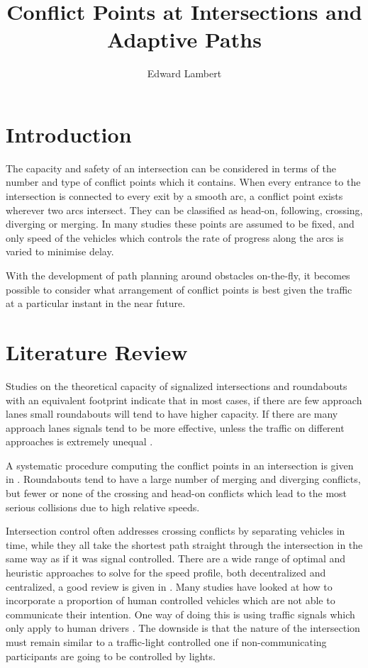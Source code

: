 \documentclass[11pt]{article} %
\title{Conflict Points at Intersections and Adaptive Paths}
\author{Edward Lambert}
\begin{document}
\maketitle

\section{Introduction}
The capacity and safety of an intersection can be considered in terms of the number and type of conflict points which it contains. When every entrance to the intersection is connected to every exit by a smooth arc, a conflict point exists wherever two arcs intersect. They can be classified as head-on, following, crossing, diverging or merging. In many studies these points are assumed to be fixed, and only speed of the vehicles which controls the rate of progress along the arcs is varied to minimise delay. 

With the development of path planning around obstacles on-the-fly, it becomes possible to consider what arrangement of conflict points is best given the traffic at a particular instant in the near future. 

\section{Literature Review} 
Studies on the theoretical capacity of signalized intersections and roundabouts with an equivalent footprint indicate that in most cases, if there are few approach lanes small roundabouts will tend to have higher capacity. If there are many approach lanes signals tend to be more effective, unless the traffic on different approaches is extremely unequal \cite{Jian-an2001}. 

A systematic procedure computing the conflict points in an intersection is given in \cite{Lu2013}. Roundabouts tend to have a large number of merging and diverging conflicts, but fewer or none of the crossing and head-on conflicts which lead to the most serious collisions due to high relative speeds.

Intersection control often addresses crossing conflicts by separating vehicles in time, while they all take the shortest path straight through the intersection in the same way as if it was signal controlled. There are a wide range of optimal and heuristic approaches to solve for the speed profile, both decentralized and centralized, a good review is given in \cite{Rios-Torres2017}. Many studies have looked at how to incorporate a proportion of human controlled vehicles which are not able to communicate their intention. One way of doing this is using traffic signals which only apply to human drivers \cite{Zhao2019}. The downside is that the nature of the intersection must remain similar to a traffic-light controlled one if non-communicating participants are going to be controlled by lights.
\end{document}
